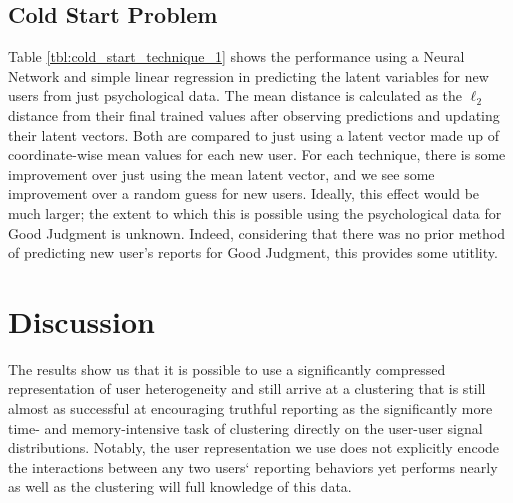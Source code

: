\documentclass{article}
\begin{document}
\subsection{Cold Start Problem} Table \ref{tbl:cold_start_technique_1} shows the performance using a Neural Network and simple linear regression in predicting the latent variables for new users from just psychological data. The mean distance is calculated as the $\ell_{2}$ distance from their final trained values after observing predictions and updating their latent vectors. Both are compared to just using a latent vector made up of coordinate-wise mean values for each new user. For each technique, there is some improvement over just using the mean latent vector, and we see some improvement over a random guess for new users. Ideally, this effect would be much larger; the extent to which this is possible using the psychological data for Good Judgment is unknown. Indeed, considering that there was no prior method of predicting new user's reports for Good Judgment, this provides some utitlity. 



\section{Discussion}





The results show us that it is possible to use a significantly compressed representation of user heterogeneity and still arrive at a clustering that is still almost as successful at encouraging truthful reporting as the significantly more time- and memory-intensive task of clustering directly on the user-user signal distributions. Notably, the user representation we use does not explicitly encode the interactions between any two users` reporting behaviors yet performs nearly as well as the clustering will full knowledge of this data.
\end{document}
